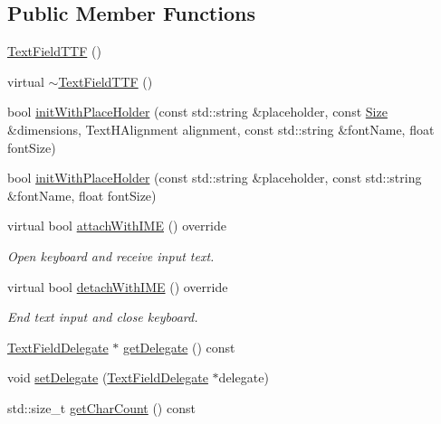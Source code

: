 \subsection*{Public Member Functions}
\begin{DoxyCompactItemize}
\item 
\hyperlink{classTextFieldTTF_a1173212d59fdbbaf51d08aff9981a4bb}{Text\+Field\+T\+TF} ()
\item 
virtual \hyperlink{classTextFieldTTF_a21e791b86e551a133db6321bb6b6953c}{$\sim$\+Text\+Field\+T\+TF} ()
\item 
bool \hyperlink{classTextFieldTTF_aec3f818b7717c3355b98f6c9bd4bcc3f}{init\+With\+Place\+Holder} (const std\+::string \&placeholder, const \hyperlink{classSize}{Size} \&dimensions, Text\+H\+Alignment alignment, const std\+::string \&font\+Name, float font\+Size)
\item 
bool \hyperlink{classTextFieldTTF_a03e5755fca447d202d9bd4268a407fac}{init\+With\+Place\+Holder} (const std\+::string \&placeholder, const std\+::string \&font\+Name, float font\+Size)
\item 
\mbox{\label{classTextFieldTTF_a82bdc3defaeb8bfb1607801954a6baf8}} 
virtual bool \hyperlink{classTextFieldTTF_a82bdc3defaeb8bfb1607801954a6baf8}{attach\+With\+I\+ME} () override
\begin{DoxyCompactList}\small\item\em Open keyboard and receive input text. \end{DoxyCompactList}\item 
\mbox{\label{classTextFieldTTF_a90dd42e2fff33f7f466457a355fac292}} 
virtual bool \hyperlink{classTextFieldTTF_a90dd42e2fff33f7f466457a355fac292}{detach\+With\+I\+ME} () override
\begin{DoxyCompactList}\small\item\em End text input and close keyboard. \end{DoxyCompactList}\item 
\hyperlink{classTextFieldDelegate}{Text\+Field\+Delegate} $\ast$ \hyperlink{classTextFieldTTF_a9e70cd73fc3190132028b659f40701d1}{get\+Delegate} () const
\item 
void \hyperlink{classTextFieldTTF_a536d7e986a4623672a6a1506dc5b6684}{set\+Delegate} (\hyperlink{classTextFieldDelegate}{Text\+Field\+Delegate} $\ast$delegate)
\item 
std\+::size\+\_\+t \hyperlink{classTextFieldTTF_ac058c16dce279485b28c944583f924df}{get\+Char\+Count} () const

\end{DoxyCompactItemize}
